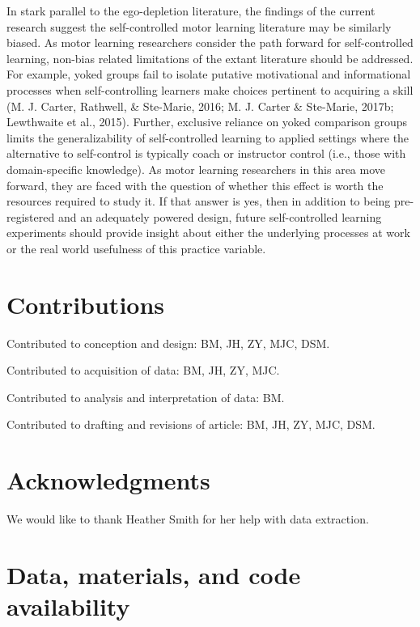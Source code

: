 \documentclass[
  english,
  man, donotrepeattitle,floatsintext]{apa7}
\begin{document}
In stark parallel to the ego-depletion literature, the findings of the current research suggest the self-controlled motor learning literature may be similarly biased. As motor learning researchers consider the path forward for self-controlled learning, non-bias related limitations of the extant literature should be addressed. For example, yoked groups fail to isolate putative motivational and informational processes when self-controlling learners make choices pertinent to acquiring a skill (M. J. Carter, Rathwell, \& Ste-Marie, 2016; M. J. Carter \& Ste-Marie, 2017b; Lewthwaite et al., 2015). Further, exclusive reliance on yoked comparison groups limits the generalizability of self-controlled learning to applied settings where the alternative to self-control is typically coach or instructor control (i.e., those with domain-specific knowledge). As motor learning researchers in this area move forward, they are faced with the question of whether this effect is worth the resources required to study it. If that answer is yes, then in addition to being pre-registered and an adequately powered design, future self-controlled learning experiments should provide insight about either the underlying processes at work or the real world usefulness of this practice variable.

\hypertarget{contributions}{%
\section{Contributions}\label{contributions}}

Contributed to conception and design: BM, JH, ZY, MJC, DSM.

Contributed to acquisition of data: BM, JH, ZY, MJC.

Contributed to analysis and interpretation of data: BM.

Contributed to drafting and revisions of article: BM, JH, ZY, MJC, DSM.

\hypertarget{acknowledgments}{%
\section{Acknowledgments}\label{acknowledgments}}

We would like to thank Heather Smith for her help with data extraction.

\hypertarget{data-materials-and-code-availability}{%
\section{Data, materials, and code availability}\label{data-materials-and-code-availability}}
\end{document}
